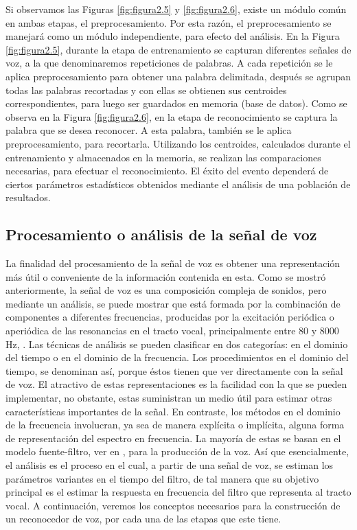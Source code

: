 Si observamos las Figuras \ref{fig:figura2.5} y \ref{fig:figura2.6}, existe un módulo común en ambas etapas, el preprocesamiento. Por esta razón, el preprocesamiento se manejará como un módulo independiente, para efecto del análisis.
\vskip 0.5cm
En la Figura \ref{fig:figura2.5}, durante la etapa de entrenamiento se capturan diferentes señales de voz, a la que denominaremos repeticiones de palabras. A cada repetición se le aplica preprocesamiento para obtener una palabra delimitada, después se agrupan todas las palabras recortadas y con ellas se obtienen sus centroides correspondientes, para luego ser guardados en memoria (base de datos).
\vskip 0.5cm
Como se observa en la Figura \ref{fig:figura2.6}, en la etapa de reconocimiento se captura la palabra que se desea reconocer. A esta palabra, también se le aplica preprocesamiento, para recortarla. Utilizando los centroides, calculados durante el entrenamiento y almacenados en la memoria, se realizan las comparaciones necesarias, para efectuar el reconocimiento. El éxito del evento dependerá de ciertos parámetros estadísticos obtenidos mediante el análisis de una población de resultados.

\subsection{Procesamiento o análisis de la señal de voz}
La finalidad del procesamiento de la señal de voz es obtener una representación más útil o conveniente de la información contenida en esta. Como se mostró anteriormente, la señal de voz es una composición compleja de sonidos, pero mediante un análisis, se puede mostrar que está formada por la combinación de componentes a diferentes frecuencias, producidas por la excitación periódica o aperiódica de las resonancias en el tracto vocal, principalmente entre 80 y 8000 Hz, \cite{rowden}.
\vskip 0.5cm
Las técnicas de análisis se pueden clasificar en dos categorías: en el dominio del tiempo o en el dominio de la frecuencia. Los procedimientos en el dominio del tiempo, se denominan así, porque éstos tienen que ver directamente con la señal de voz. El atractivo de estas representaciones es la facilidad con la que se pueden implementar, no obstante, estas suministran un medio útil para estimar otras características importantes de la señal. En contraste, los métodos en el dominio de la frecuencia involucran, ya sea de manera explícita o implícita, alguna forma de representación del espectro en frecuencia. 
\vskip 0.5cm
La mayoría de estas se basan en el modelo fuente-filtro, ver en \cite{rowden}, para la producción de la voz. Así que esencialmente, el análisis es el proceso en el cual, a partir de una señal de voz, se estiman los parámetros variantes en el tiempo del filtro, de tal manera que su objetivo principal es el estimar la respuesta en frecuencia del filtro que representa al tracto vocal. 
\vskip 0.5cm
A continuación, veremos los conceptos necesarios para la construcción de un reconocedor de voz, por cada una de las etapas que este tiene.

